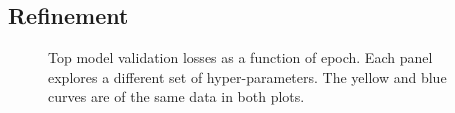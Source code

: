 \documentclass[12pt,journal,compsoc]{IEEEtran}
\begin{document}
\subsection{Refinement}

\begin{figure}[!t]
\normalsize
{}
\caption{Top model validation losses as a function of epoch. Each panel explores a different set of hyper-parameters. The yellow and blue curves are of the same data in both plots.}
\label{fig:top1_pp_pl_sz}
\vspace*{4pt}
\end{figure}



\end{document}
